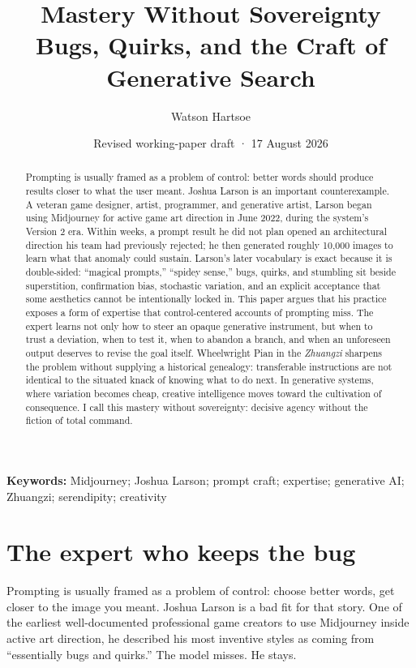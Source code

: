 \documentclass[11pt]{article}
\title{Mastery Without Sovereignty\\\large Bugs, Quirks, and the Craft of Generative Search}
\author{Watson Hartsoe}
\date{Revised working-paper draft · 17 August 2026}
\begin{document}
\maketitle
\thispagestyle{firstpage}

\begin{abstract}
Prompting is usually framed as a problem of control: better words should produce results closer to what the user meant. Joshua Larson is an important counterexample. A veteran game designer, artist, programmer, and generative artist, Larson began using Midjourney for active game art direction in June 2022, during the system's Version 2 era. Within weeks, a prompt result he did not plan opened an architectural direction his team had previously rejected; he then generated roughly 10,000 images to learn what that anomaly could sustain. Larson's later vocabulary is exact because it is double-sided: ``magical prompts,'' ``spidey sense,'' bugs, quirks, and stumbling sit beside superstition, confirmation bias, stochastic variation, and an explicit acceptance that some aesthetics cannot be intentionally locked in. This paper argues that his practice exposes a form of expertise that control-centered accounts of prompting miss. The expert learns not only how to steer an opaque generative instrument, but when to trust a deviation, when to test it, when to abandon a branch, and when an unforeseen output deserves to revise the goal itself. Wheelwright Pian in the \emph{Zhuangzi} sharpens the problem without supplying a historical genealogy: transferable instructions are not identical to the situated knack of knowing what to do next. In generative systems, where variation becomes cheap, creative intelligence moves toward the cultivation of consequence. I call this mastery without sovereignty: decisive agency without the fiction of total command.
\end{abstract}

\textbf{Keywords:} Midjourney; Joshua Larson; prompt craft; expertise; generative AI; Zhuangzi; serendipity; creativity

\section{The expert who keeps the bug}
Prompting is usually framed as a problem of control: choose better words, get closer to the image you meant. Joshua Larson is a bad fit for that story. One of the earliest well-documented professional game creators to use Midjourney inside active art direction, he described his most inventive styles as coming from ``essentially bugs and quirks.'' \cite{JoshuaBugsScreenshot} The model misses. He stays.
\end{document}
